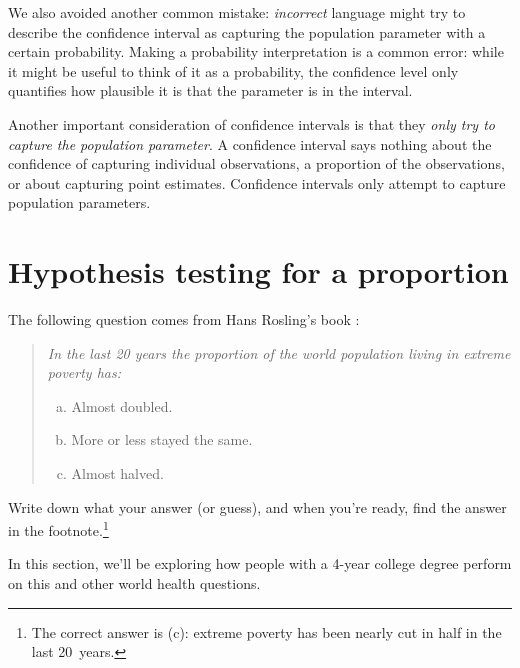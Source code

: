 We also avoided another common mistake:
\emph{incorrect} language might try to describe the confidence interval
as capturing the population parameter with a certain probability.
Making a probability interpretation is a common error:
while it might be useful to think of it as a probability,
the confidence level only quantifies how plausible
it is that the parameter is in the interval.

Another important consideration of confidence intervals is that they
\emph{only try to capture the population parameter}. A confidence
interval says nothing about the confidence of capturing individual
observations, a proportion of the observations, or about capturing
point estimates. Confidence intervals only attempt to capture
population parameters.







\section{Hypothesis testing for a proportion}
\label{hypothesisTesting}


The following question comes from Hans Rosling's book
\emph{}:
\begin{quote}{\em
  In the last 20 years the proportion of the
  world population living in extreme poverty has:
  \begin{enumerate}[a.]
  \item Almost doubled.
  \item More or less stayed the same.
  \item Almost halved.
  \end{enumerate}
}\end{quote}
Write down what your answer (or guess),
and when you're ready, find the answer in the
footnote.\footnote{The correct answer is (c):
extreme poverty has been nearly cut in half in the last 20~years.}

In this section,
we'll be exploring how people with a 4-year college
degree perform on this and other world health questions.

